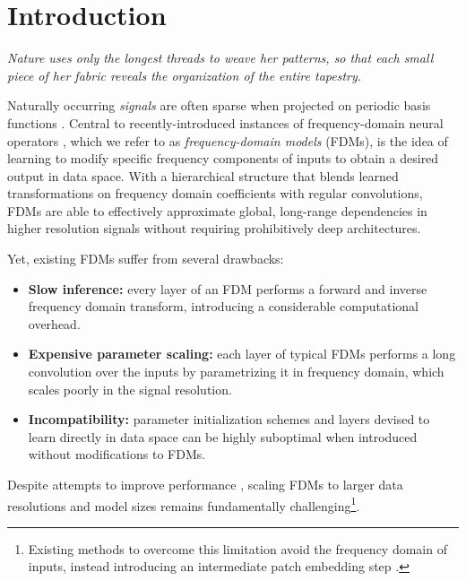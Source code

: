 \section{Introduction}
\begin{center}
    \small \textit{Nature uses only the longest threads to weave her patterns, so that each small piece of her fabric reveals the organization of the entire tapestry. \citep{feynman1965character}}
\end{center}

Naturally occurring \textit{signals} are often sparse when projected on periodic basis functions \citep{strang1999discrete}.
Central to recently-introduced instances of frequency-domain neural operators \citep{li2020fourier,tran2021factorized}, which we refer to as \textit{frequency-domain models} (FDMs), is the idea of learning to modify specific frequency components of inputs to obtain a desired output in data space. With a hierarchical structure that blends learned transformations on frequency domain coefficients with regular convolutions, FDMs are able to effectively approximate global, long-range dependencies in higher resolution signals without requiring prohibitively deep architectures. 

\newpage

Yet, existing FDMs suffer from several drawbacks:

\begin{itemize}[leftmargin=1cm]
    \item[1.] \textbf{Slow inference:} every layer of an FDM performs a forward and inverse frequency domain transform, introducing a considerable computational overhead. 
    \item[2.] \textbf{Expensive parameter scaling:} each layer of typical FDMs \citep{li2020fourier} performs a long convolution over the inputs by parametrizing it in frequency domain, which scales poorly in the signal resolution.
    \item[3.] \textbf{Incompatibility:} parameter initialization schemes and layers devised to learn directly in data space can be highly suboptimal when introduced without modifications to FDMs.        
\end{itemize}

Despite attempts to improve performance \citep{gupta2021multiwavelet,tran2021factorized}, scaling FDMs to larger data resolutions and model sizes remains fundamentally challenging\footnote{Existing methods to overcome this limitation avoid the frequency domain of inputs, instead introducing an intermediate patch embedding step \citep{guibas2021adaptive,pathak2022fourcastnet}.}.

